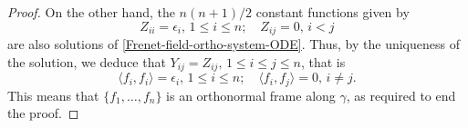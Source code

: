 \documentclass[11pt]{amsart}
\theoremstyle{plain}
\theoremstyle{definition}
\numberwithin{equation}{section}
\begin{document}
\begin{proof}
On the other hand, the ${n(n+1)}/{2}$ constant functions given by
\[ 
Z_{ii} = \epsilon_i, \, 1 \leq i \leq n; \quad Z_{ij} = 0, \, i < j
\]
are also solutions of \eqref{Frenet-field-ortho-system-ODE}. 
Thus, by the uniqueness of the solution, we deduce that $Y_{ij} = Z_{ij}, \, 1 \leq i \leq j \leq n$, that is 
\[
\langle f_i, f_i \rangle = \epsilon_i, \, 1 \leq i \leq n; \quad \langle f_i, f_j \rangle = 0, \, i \neq j.
\]
This means that $\{f_1,\dots,f_n\}$ is an orthonormal frame along $\gamma$, as required to end the proof.
\end{proof}

%
%
\end{document}
